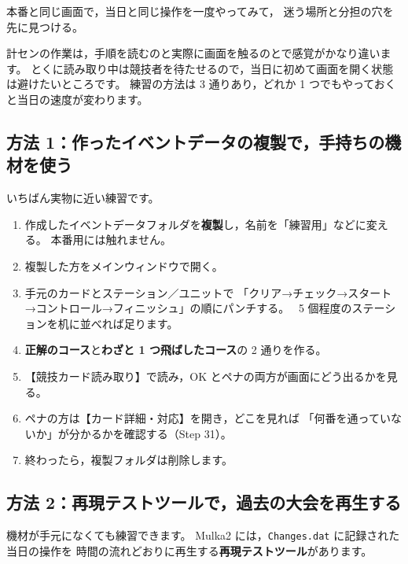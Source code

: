 
\begin{Goal}
本番と同じ画面で，当日と同じ操作を一度やってみて，
迷う場所と分担の穴を先に見つける。
\end{Goal}

計センの作業は，手順を読むのと実際に画面を触るのとで感覚がかなり違います。
とくに読み取り中は競技者を待たせるので，当日に初めて画面を開く状態は避けたいところです。
練習の方法は 3 通りあり，どれか 1 つでもやっておくと当日の速度が変わります。

\subsection*{方法 1：作ったイベントデータの複製で，手持ちの機材を使う}

いちばん実物に近い練習です。

\begin{enumerate}
\item 作成したイベントデータフォルダを\textbf{複製}し，名前を「練習用」などに変える。
      本番用には触れません。
\item 複製した方をメインウィンドウで開く。
\item 手元のカードとステーション／ユニットで
      「クリア→チェック→スタート→コントロール→フィニッシュ」の順にパンチする。
      \tSI\ 5 個程度のステーションを机に並べれば足ります。
\item \textbf{正解のコース}と\textbf{わざと 1 つ飛ばしたコース}の 2 通りを作る。
\item 【競技カード読み取り】で読み，OK とペナの両方が画面にどう出るかを見る。
\item ペナの方は【カード詳細・対応】を開き，どこを見れば
      「何番を通っていないか」が分かるかを確認する（Step 31）。
\item 終わったら，複製フォルダは削除します。
\end{enumerate}

\subsection*{方法 2：再現テストツールで，過去の大会を再生する}

機材が手元になくても練習できます。
Mulka2 には，\texttt{Changes.dat} に記録された当日の操作を
時間の流れどおりに再生する\textbf{再現テストツール}があります。\ver

